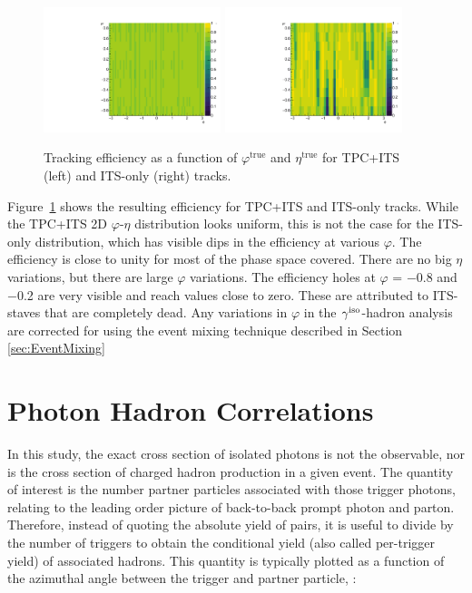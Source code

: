 \begin{figure}[h]
\center
\includegraphics[width=0.46\textwidth]{Data_Analysis/Tracking/etaPhi_eff_tpc.pdf}
\includegraphics[width=0.46\textwidth]{Data_Analysis/Tracking/etaPhi_eff_4layers.pdf}
\caption{Tracking efficiency as a function of $\varphi^{\mathrm{true}}$ and $\eta^{\mathrm{true}}$ for TPC+ITS (left) and ITS-only (right) tracks.}
\label{fig:2Defficiency}
\end{figure}

Figure~\ref{fig:2Defficiency} shows the resulting efficiency for TPC+ITS and ITS-only tracks. While the TPC+ITS 2D $\varphi$-$\eta$ distribution looks uniform, this is not the case for the ITS-only distribution, which has visible dips in the efficiency at various $\varphi$. The efficiency is close to unity for most of the phase space covered. There are no big $\eta$ variations, but there are large $\varphi$ variations. The efficiency holes at $\varphi$ = $-$0.8 and $-$0.2 are very visible and reach values close to zero. These are attributed to ITS-staves that are completely dead. Any variations in $\varphi$ in the $\gamma^\mathrm{iso}$-hadron analysis are corrected for using the event mixing technique described in Section \ref{sec:EventMixing}
\FloatBarrier



\section{Photon Hadron Correlations}


In this study, the exact cross section of isolated photons is not the observable, nor is the cross section of charged hadron production in a given event. The quantity of interest is the number partner particles associated with those trigger photons, relating to the leading order picture of back-to-back prompt photon and parton. Therefore, instead of quoting the absolute yield of pairs, it is useful to divide by the number of triggers to obtain the conditional yield (also called per-trigger yield) of associated hadrons. This quantity is typically plotted as a function of the azimuthal angle between the trigger and partner particle, \deltaphi:

